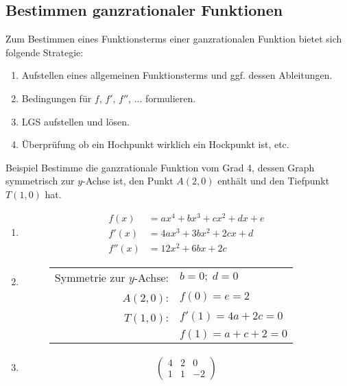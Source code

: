 \documentclass{article}
\begin{document}
\subsection{Bestimmen ganzrationaler Funktionen}
Zum Bestimmen eines Funktionsterms einer ganzrationalen
Funktion bietet sich folgende Strategie:
\begin{enumerate}
    \item Aufstellen eines allgemeinen Funktionsterms und ggf. dessen Ableitungen.
    \item Bedingungen für $f$, $f'$, $f''$, ... formulieren.
    \item LGS aufstellen und lösen.
    \item Überprüfung ob ein Hochpunkt wirklich ein Hockpunkt ist, etc.
\end{enumerate}
\begin{boxx}[DarkBlue]{Beispiel}
    Bestimme die ganzrationale Funktion vom Grad 4, 
    dessen Graph symmetrisch zur $y$-Achse ist,
    den Punkt $A(2, 0)$ enthält und den Tiefpunkt $T(1, 0)$ hat.
    \begin{enumerate}
        \item \begin{align*}
            f(x) &= ax^4+ bx^3 + cx^2 + dx + e \\
            f'(x) &= 4ax^3 + 3bx^2 +2cx + d \\
            f''(x) &= 12x^2 + 6bx + 2c
        \end{align*}
        \item \hspace*{1mm}
        \begin{figure}[H]
            \centering
            \begin{tabular}{rl}
                Symmetrie zur $y$-Achse: & $b=0;\;d=0$ \\
                $A(2, 0)$: & $f(0) = e = 2$ \\
                $T(1, 0)$: & $f'(1) = 4a + 2c = 0$ \\
                & $f(1) = a + c + 2 = 0$
            \end{tabular}
        \end{figure}
        \item 
        \begin{align*}
            &\left( \begin{array}{cc|c} 4 & 2 & 0 \\ 1 & 1 & -2 \end{array} \right) \begin{array}{ll}

\end{array}
\end{align*}
\end{enumerate}
\end{boxx}
\end{document}

